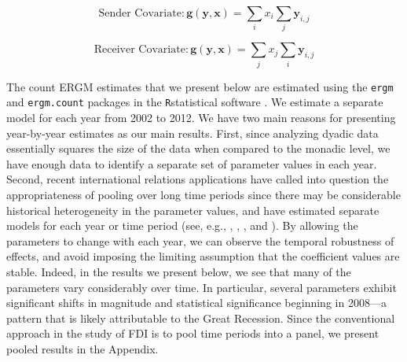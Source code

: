 \documentclass[reqno,onecolumn,letterpaper,12pt]{article}
\newcommand{\R}{\texttt{R}} %
\begin{document}
$$ \text{Sender Covariate}: \bm{g(y,x)} = \sum_{i}x_i \sum_{j} \bm{y}_{i,j}$$

$$ \text{Receiver Covariate}: \bm{g(y,x)} = \sum_{j}x_j \sum_{i} \bm{y}_{i,j}$$

\noindent The count ERGM estimates that we present below are estimated using the \texttt{ergm} \citep{ergm} and \texttt{ergm.count} \citep{ergmcount} packages in the \R \space statistical software \citep{r}. We estimate a separate model for each year from 2002 to 2012. We have two main reasons for presenting year-by-year estimates as our main results. First, since analyzing dyadic data essentially squares the size of the data when compared to the monadic level, we have enough data to identify a separate set of parameter values in each year. Second, recent international relations applications have called into question the appropriateness of pooling over long time periods since there may be considerable historical heterogeneity in the parameter values, and have estimated separate models for each year or time period (see, e.g., \citet{cranmer2014reciprocity}, \citet{cranmer2012toward},  \cite{cao2014democracies}, and \cite{ward2007persistent}).   By allowing the parameters to change with each year, we can observe the temporal robustness of effects, and avoid imposing the limiting assumption that the coefficient values are stable. Indeed, in the results we present below, we see that many of the parameters vary considerably over time. In particular, several parameters exhibit significant shifts in magnitude and statistical significance beginning in 2008---a pattern that is likely attributable to the Great Recession. Since the conventional approach in the study of FDI is to pool time periods into a panel, we present pooled results in the Appendix.
\end{document}
